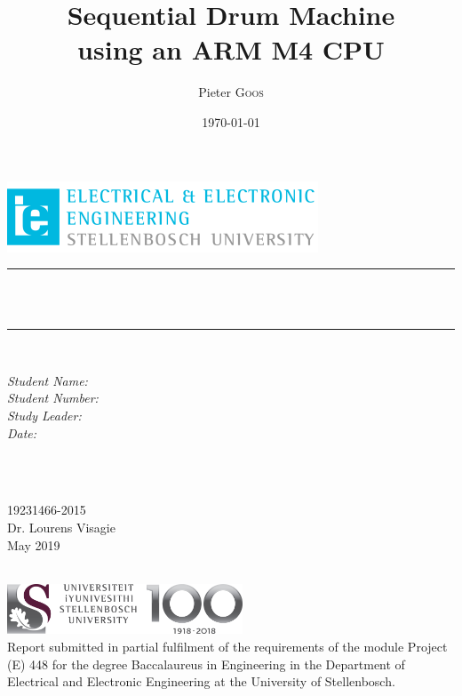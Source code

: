 \documentclass[12pt,a4paper]{report}
\title{Sequential Drum Machine \\using an ARM M4 CPU} %
\author{Pieter \textsc{Goos}} %
\date{\today} %
\makeatletter
\let\thetitle\@title
\let\theauthor\@author
\makeatother
\begin{document}
\begin{titlepage}
    \centering
    \vspace*{0.5 cm}
    \includegraphics[scale = 2]{EELogo.png}\\[1.0 cm]   %
    \vspace{3cm}
    \rule{\linewidth}{0.2 mm} \\[0.4 cm]
    { \huge \bfseries \thetitle }\\[0.4 cm]
    \rule{\linewidth}{0.2 mm} \\[1.5 cm]
    \vspace{2cm}
	\begin{minipage}{6.5cm}
		\begin{flushleft} \large
			\emph{Student Name:}\\
			\emph{Student Number:}\\
			\emph{Study Leader:}\\
			\emph{Date:}
		\end{flushleft}
	\end{minipage}~
	\begin{minipage}{6.5cm}
		\begin{flushright} \large
		\theauthor\\
		19231466-2015\\
		Dr. Lourens Visagie\\
		May 2019
		\end{flushright}
	\end{minipage}\\[2 cm]
    \vfill
    \includegraphics[width=7cm]{SUNLogo.jpg}\\[1.0 cm]
    Report submitted in partial fulfilment of the requirements of the module Project (E) 448 for the degree Baccalaureus in Engineering in the Department of Electrical and Electronic Engineering at the University of Stellenbosch.
    
\end{titlepage}

\end{document}
